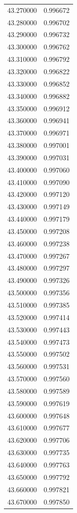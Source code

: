 \begin{tabular}{rr}
43.270000 & 0.996672 \\
43.280000 & 0.996702 \\
43.290000 & 0.996732 \\
43.300000 & 0.996762 \\
43.310000 & 0.996792 \\
43.320000 & 0.996822 \\
43.330000 & 0.996852 \\
43.340000 & 0.996882 \\
43.350000 & 0.996912 \\
43.360000 & 0.996941 \\
43.370000 & 0.996971 \\
43.380000 & 0.997001 \\
43.390000 & 0.997031 \\
43.400000 & 0.997060 \\
43.410000 & 0.997090 \\
43.420000 & 0.997120 \\
43.430000 & 0.997149 \\
43.440000 & 0.997179 \\
43.450000 & 0.997208 \\
43.460000 & 0.997238 \\
43.470000 & 0.997267 \\
43.480000 & 0.997297 \\
43.490000 & 0.997326 \\
43.500000 & 0.997356 \\
43.510000 & 0.997385 \\
43.520000 & 0.997414 \\
43.530000 & 0.997443 \\
43.540000 & 0.997473 \\
43.550000 & 0.997502 \\
43.560000 & 0.997531 \\
43.570000 & 0.997560 \\
43.580000 & 0.997589 \\
43.590000 & 0.997619 \\
43.600000 & 0.997648 \\
43.610000 & 0.997677 \\
43.620000 & 0.997706 \\
43.630000 & 0.997735 \\
43.640000 & 0.997763 \\
43.650000 & 0.997792 \\
43.660000 & 0.997821 \\
43.670000 & 0.997850 \\

\end{tabular}
